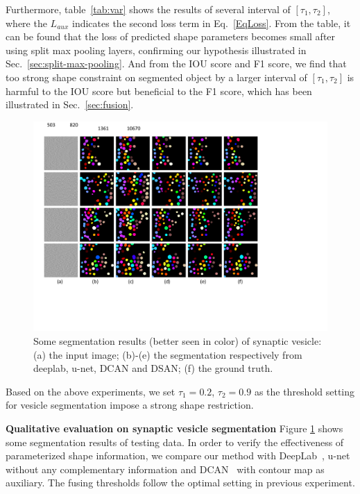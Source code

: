 Furthermore, table~\ref{tab:var} shows the results of several interval of $[\tau_1,\tau_2]$, where the $L_{aux}$ indicates the second loss term in Eq.~\ref{EqLoss}.
From the table, it can be found that the loss of predicted shape parameters becomes small after using split max pooling layers, confirming our hypothesis illustrated in Sec.~\ref{sec:split-max-pooling}.
And from the IOU score and F1 score, we find that too strong shape constraint on segmented object by a larger interval of $[\tau_1,\tau_2]$ is harmful to the IOU score but beneficial to the F1 score, which has been illustrated in Sec.~\ref{sec:fusion}.
\begin{figure}
    \begin{center}
        \includegraphics[width=6.8in]{figures/FigVesicle.pdf}
    \end{center}
    \caption{Some segmentation results (better seen in color) of synaptic vesicle: (a) the input image; (b)-(e) the segmentation respectively from deeplab, u-net, DCAN and DSAN; (f) the ground truth.}
    \label{FigVesicle}
\end{figure}

Based on the above experiments, we set $\tau_1=0.2$, $\tau_2=0.9$ as the threshold setting for vesicle segmentation impose a strong shape restriction.

\noindent\textbf{Qualitative evaluation on synaptic vesicle segmentation}
Figure \ref{FigVesicle} shows some segmentation results of testing data.
In order to verify the effectiveness of parameterized shape information, we compare our method with DeepLab~\cite{Chen2014a}, u-net~\cite{Ronneberger2015} without any complementary information and DCAN~\cite{Chen2016a} with contour map as auxiliary.
The fusing thresholds follow the optimal setting in previous experiment.

